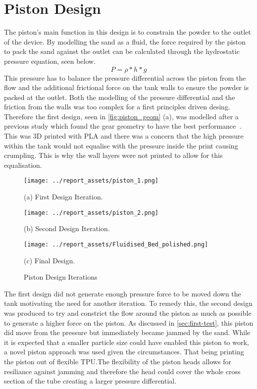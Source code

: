 \section{Piston Design}\label{sec:piston}
The piston's main function in this design is to constrain the powder to the outlet of the device. By modelling the sand as a fluid, the force required by the piston to pack the sand against the outlet can be calculated through the hydrostatic pressure equation, seen below. 
\begin{equation}\label{equ:hydrostatic}
P = \rho * h * g
\end{equation}
This pressure has to balance the pressure differential across the piston from the flow and the additional frictional force on the tank walls to ensure the powder is packed at the outlet. Both the modelling of the pressure differential and the friction from the walls was too complex for a first principles driven desing. Therefore the first design, seen in \autoref{fig:piston_geom} (a), was modelled after a previous study which found the gear geometry to have the best performance~\cite{TANG2023118406}. This was 3D printed with PLA and there was a concern that the high pressure within the tank would not equalise with the pressure inside the print causing crumpling. This is why the wall layers were not printed to allow for this equalisation. 
\begin{figure}[htbp]
    \centering

    \begin{minipage}{0.3\textwidth}
        \centering
        \texttt{[image: ../report\_assets/piston\_1.png]}
        \caption*{(a) First Design Iteration.}\label{fig:piston_geom_1}
    \end{minipage}
    \hfill
    \begin{minipage}{0.3\textwidth}
        \centering
        \texttt{[image: ../report\_assets/piston\_2.png]}
        \caption*{(b) Second Design Iteration.}\label{fig:piston_geom_2}
    \end{minipage}
    \hfill
    \begin{minipage}{0.3\textwidth}
        \centering
        \texttt{[image: ../report\_assets/Fluidised\_Bed\_polished.png]}
        \caption*{(c) Final Design.}\label{fig:piston_geom_3}
    \end{minipage}
    \caption{Piston Design Iterations}\label{fig:piston_geom}
\end{figure}
The first design did not generate enough pressure force to be moved down the tank motivating the need for another iteration. To remedy this, the second design was produced to try and constrict the flow around the piston as much as possible to generate a higher force on the piston. As discussed in \autoref{sec:first-test}, this piston did move from the pressure but immediately became jammed by the sand. While it is expected that a smaller particle size could have enabled this piston to work, a novel piston approach was used given the circumstances. That being printing the piston out of flexible TPU.\@ The flexibility of the piston heads allows for resiliance against jamming and therefore the head could cover the whole cross section of the tube creating a larger pressure differential.

